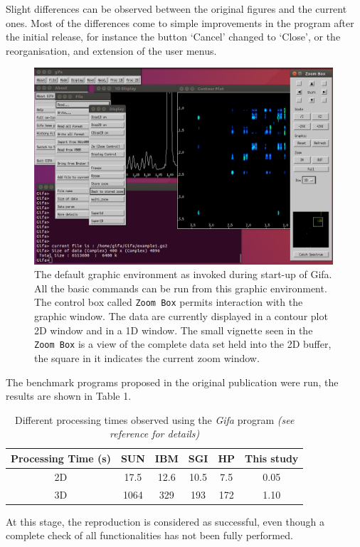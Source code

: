 Slight differences can be observed between the original figures and the
current ones. Most of the differences come to simple improvements in the
program after the initial release, for instance the button `Cancel'
changed to `Close', or the reorganisation, and extension of the user
menus.

\begin{figure}
\centering
\includegraphics[width=0.99\textwidth]{figure3.png}
\caption{The default graphic environment as invoked during start-up of
Gifa. All the basic commands can be run from this graphic environment.
The control box called \texttt{Zoom\ Box} permits interaction with the
graphic window. The data are currently displayed in a contour plot 2D
window and in a 1D window. The small vignette seen in the
\texttt{Zoom\ Box} is a view of the complete data set held into the 2D
buffer, the square in it indicates the current zoom window.}
\end{figure}

The benchmark programs proposed in the original publication were run,
the results are shown in Table 1.

\begin{table}[h]
\centering
  \caption{Different processing times observed using the \emph{Gifa}
program \emph{(see reference \cite{Pons_1996} for details)} }
\begin{tabular}[]{@{}cccccc@{}}
\hline
Processing Time (s) & SUN & IBM & SGI & HP & This study\tabularnewline
\hline
2D & 17.5 & 12.6 & 10.5 & 7.5 & 0.05\tabularnewline
3D & 1064 & 329 & 193 & 172 & 1.10\tabularnewline
\hline
\end{tabular}
\end{table}

At this stage, the reproduction is considered as successful, even though
a complete check of all functionalities has not been fully performed.

